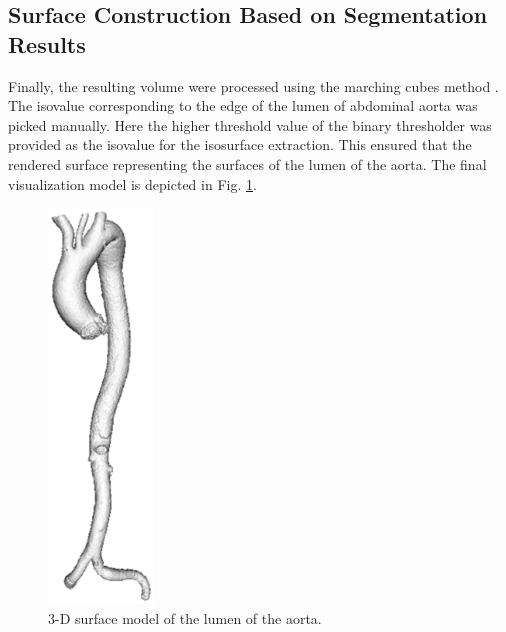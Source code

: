 \subsection{Surface Construction Based on Segmentation Results}
Finally, the resulting volume were processed using the marching cubes method \cite{Lorensen1987MC}.
The isovalue corresponding to the edge of the lumen of abdominal aorta was picked manually.
Here the higher threshold value of the binary thresholder was provided as the isovalue for the isosurface extraction.
This ensured that the rendered surface representing the surfaces of the lumen of the aorta.
The final visualization model is depicted in Fig. \ref{fig:VisualizationModel}.
\begin{figure}[t]
\centering
\includegraphics[width=1.1in]{figures/chap03/model.eps}
\caption{3-D surface model of the lumen of the aorta.}
\label{fig:VisualizationModel}
\end{figure} 